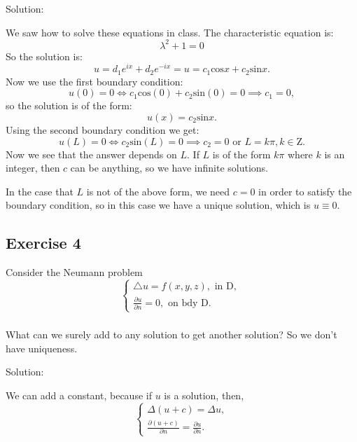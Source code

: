 \documentclass{article}
\begin{document}
		Solution:

		We saw how to solve these equations in class.
		The characteristic equation is:
		\[
			\lambda^2 +1=0
		\]
		So the solution is:
\[u = d_1e^{ix} + d_2e^{-ix} =u = c_1\text{cos}x +	c_2\text{sin}x.\]
		Now we use the first boundary condition:
		\[
			u(0)=0 \iff c_1\text{cos}(0) +
			c_2\text{sin}(0) = 0 \implies c_1=0,
	        \]
		so the solution is of the form:
		\[
			u(x)=c_{2}\text{sin}x.
		\]
		Using the second boundary condition we get:
		\[
			u(L)=0 \iff c_{2}\text{sin}(L) =0 \implies c_{2}=0 \text{ or } L=k\pi, k\in \mathrm{Z}.
		\]
		Now we see that the answer depends on $L$. If $L$ is of the form $k\pi$ where $k$ is an integer, then $c$ can be anything, so we have infinite solutions.

		In the case that $L$ is not of the above form, we need $c=0$
		in order to satisfy the boundary condition, so in
		this case we have a unique solution, which is $u
		\equiv 0$.
		
		\subsection{Exercise 4}
		Consider the Neumann problem
		\begin{equation*}
			\begin{cases}
				\triangle u = f(x,y,z), \text{ in D, }
				\\
				\frac{\partial u}{\partial n}=0, \text{ on bdy D. }
			\end{cases}
		\end{equation*}
	
		\subsubsection{}
		What can we surely add to any
		solution to get another solution? So we
	don't have uniqueness.

		Solution:

		We can add a constant, because if $u$ is a solution,
		then,
		\begin{equation*}
			\begin{cases}
			\Delta(u+c)= \Delta u,
             \\
			 \frac{\partial(u+c)}{\partial n}=\frac{\partial u}{\partial n}.
			\end{cases}
		\end{equation*}
		
\end{document}
